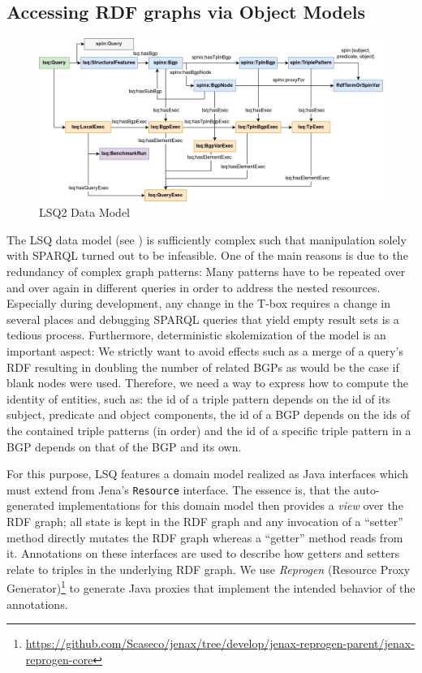 \subsection{Accessing RDF graphs via Object Models}

\begin{figure}
\includegraphics[width=\textwidth]{images/lsq2-datamodel-color-large}
\caption{LSQ2 Data Model}
\label{fig:datamodel}
\end{figure}

The LSQ data model (see ) is sufficiently complex such that manipulation solely
with SPARQL turned out to be infeasible. One of the main reasons is due to the redundancy of complex graph patterns: Many patterns have to be repeated over and over again in different queries in order to address the nested resources. %
Especially during development, any change in the T-box requires a change in several places and debugging SPARQL queries that yield empty result sets is a tedious process. Furthermore, deterministic skolemization of the model is an important aspect: We strictly want to avoid effects such as a merge of a query's RDF resulting in doubling the number of related BGPs as would be the case if blank nodes were used. Therefore, we need a way to express how to compute the identity of entities, such as: the id of a triple pattern depends on the id of its subject, predicate and object components, the id of a BGP depends on the ids of the contained triple patterns (in order) and the id of a specific triple pattern in a BGP depends on that of the BGP and its own.

For this purpose, LSQ features a domain model realized as Java interfaces which must extend from Jena's \texttt{Resource} interface. The essence is, that the auto-generated implementations for this domain model then provides a \emph{view} over the RDF graph; all state is kept in the RDF graph and any invocation of a ``setter'' method directly mutates the RDF graph whereas a ``getter'' method reads from it.
Annotations on these interfaces are used to describe how getters and setters relate to triples in the underlying RDF graph. We use \emph{Reprogen} (Resource Proxy Generator)\footnote{\url{https://github.com/Scaseco/jenax/tree/develop/jenax-reprogen-parent/jenax-reprogen-core}} to generate Java proxies that implement the intended behavior of the annotations.

